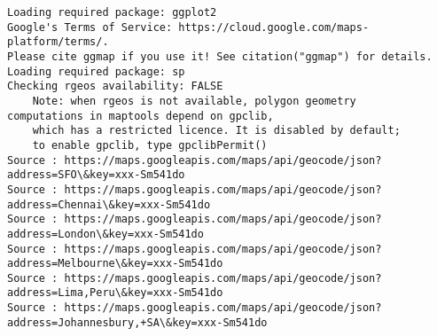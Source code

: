 \documentclass[11pt]{article}
\begin{document}
    \begin{Verbatim}[commandchars=\\\{\}]
Loading required package: ggplot2
Google's Terms of Service: https://cloud.google.com/maps-platform/terms/.
Please cite ggmap if you use it! See citation("ggmap") for details.
Loading required package: sp
Checking rgeos availability: FALSE
 	Note: when rgeos is not available, polygon geometry 	computations in maptools depend on gpclib,
 	which has a restricted licence. It is disabled by default;
 	to enable gpclib, type gpclibPermit()
Source : https://maps.googleapis.com/maps/api/geocode/json?address=SFO\&key=xxx-Sm541do
Source : https://maps.googleapis.com/maps/api/geocode/json?address=Chennai\&key=xxx-Sm541do
Source : https://maps.googleapis.com/maps/api/geocode/json?address=London\&key=xxx-Sm541do
Source : https://maps.googleapis.com/maps/api/geocode/json?address=Melbourne\&key=xxx-Sm541do
Source : https://maps.googleapis.com/maps/api/geocode/json?address=Lima,Peru\&key=xxx-Sm541do
Source : https://maps.googleapis.com/maps/api/geocode/json?address=Johannesbury,+SA\&key=xxx-Sm541do

    \end{Verbatim}

    \begin{center}
    \end{center}
    { \hspace*{\fill} \\}
    
\end{document}
